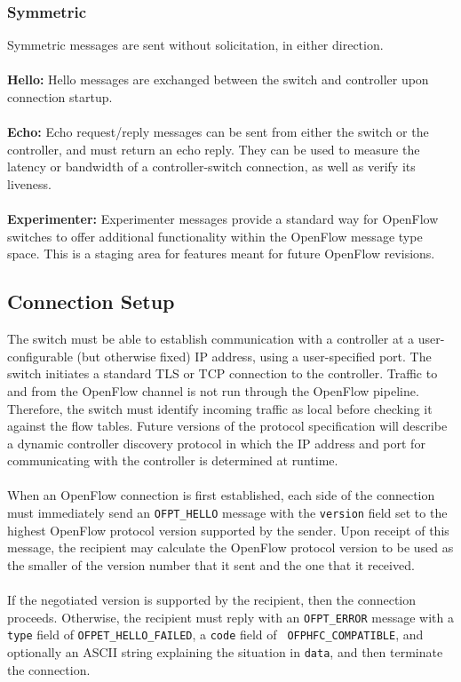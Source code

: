 \documentclass[10pt]{article}
\begin{document}
\subsubsection{Symmetric}
Symmetric messages are sent without solicitation, in either direction.
\\\\
\textbf{Hello:} Hello messages are exchanged between the switch and controller upon connection startup.
\\\\
\textbf{Echo:} Echo request/reply messages can be sent from either the switch or the controller, and must return an echo reply.  They can be used to measure the latency or bandwidth of a controller-switch connection, as well as verify its liveness.
\\\\
\textbf{Experimenter:} Experimenter messages provide a standard way for OpenFlow switches to offer additional functionality within the OpenFlow message type space.  This is a staging area for features meant for future OpenFlow revisions.

\subsection{Connection Setup}
The switch must be able to establish communication with a controller at a user-configurable (but otherwise fixed) IP address, using a user-specified port.  The switch initiates a standard TLS or TCP connection to the controller.  Traffic to and from the OpenFlow channel is not run through the OpenFlow pipeline.  Therefore, the switch must identify incoming traffic as local before checking it against the flow tables.  Future versions of the protocol specification will describe a dynamic controller discovery protocol in which the IP address and port for communicating with the controller is determined at runtime.
\\\\
When an OpenFlow connection is first established, each side of the connection must immediately send an \verb|OFPT_HELLO| message with the \verb|version| field set to the highest OpenFlow protocol version supported by the sender.  Upon receipt of this message, the recipient may calculate the OpenFlow protocol version to be used as the smaller of the version number that it sent and the one that it received.
\\\\
If the negotiated version is supported by the recipient, then the connection proceeds. Otherwise, the recipient must reply with an \verb|OFPT_ERROR| message with a \verb|type| field of \verb|OFPET_HELLO_FAILED|, a \verb|code| field of \verb| OFPHFC_COMPATIBLE|, and optionally an ASCII string explaining the situation in \verb|data|, and then terminate the connection.
\end{document}
